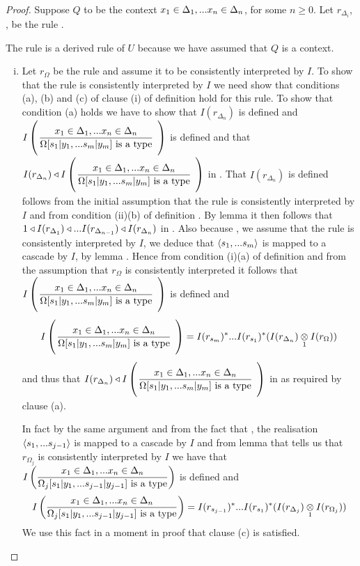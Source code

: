 \begin{proof}
Suppose  $Q$ to be the context $x_1 \in \Delta_1,... x_{n} \in \Delta_{n}$, for some $n \geq 0$. Let $r_{\Delta_i}$, \foreachi, be the rule .

The rule  is a derived rule of $U$ because we have assumed that $Q$ is a context. 
\begin{enumerate}[(i)]
\item
\newcommand{\targetruleone}{\gatdisplayrule{\xDelta{n}}{\isT{\Omega[\SUBsFORy{m}]}}}
Let $r_\Omega$ be the rule \ZOmega and assume it to be consistently interpreted by $I$.
To show that the rule \ZOmegaSUBsmFORym is consistently interpreted by $I$ we need show that conditions (a), (b) and (c)
of clause (i) of definition  hold for this rule.
To  show  that condition (a) holds we have to show that $I(r_{\Delta_n})$ is defined 
and $\Imap{\targetruleone}$ is defined and that  $I(r_{\Delta_n}) \base \Imap{\targetruleone}$ in \catc. 
That $I(r_{\Delta_n})$ is defined follows from the initial assumption
that the rule  is consistently interpreted by $I$
and from condition (ii)(b) of definition . 
By  lemma  it then follows that 
$1 \triangleleft I(r_{\Delta_1}) \triangleleft ... I(r_{\Delta_{n-1}}) \triangleleft I(r_{\Delta_n})$ in \catc.
Also because \foreachj,  we assume that the rule  is consistently interpreted by $I$, 
we deduce that $\langle s_1,...s_{m}\rangle$ is mapped to a cascade by $I$, by lemma . Hence 
from condition (i)(a) of definition  and from the assumption that $r_\Omega$ is consistently interpreted it follows that $\Imap{\targetruleone}$ is defined and 
\begin{equation}
\label{omegaSubsmapping}
\Imap{\targetruleone} = I(r_{s_m})^*...I(r_{s_1})^*(\crossx{I(r_{\Delta_n})}{I(r_\Omega)}{1})
\end{equation}
and thus that $I(r_{\Delta_n}) \base \Imap{\targetruleone}$ in \catcw as required by clause (a).

In fact by the same argument and from the fact that \foreachj,  
the realisation $\langle s_1,...s_{j-1}\rangle$ is mapped to a cascade by $I$ and from lemma  that tells us that 
$r_{\Omega_j}$ is consistently interpreted by $I$ we have that
$\displaystyle I\left(\frac{x_1 \in \Delta_1,... x_{n} \in \Delta_{n}}{\Omega_j[s_1|y_1,...s_{j-1}|y_{j-1}]\mbox{ is a type}}\right)$ is defined and 
\begin{equation}
\label{omegajSubsmapping}
\Imappedrule{\xDelta{n}}{\isT{\Omega_j[\SUBsFORy{j-1}]}} 
= I(r_{s_{j-1}})^*...I(r_{s_1})^*(\crossx{I(r_{\Delta_j})}{I(r_{\Omega_j})}{1})
\end{equation}
We use this fact in a moment in proof that clause (c) is satisfied.


\end{enumerate}
\end{proof}
